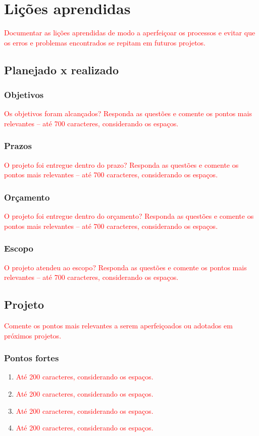 \chapter{Lições aprendidas}

\textcolor{red}{Documentar as lições aprendidas de modo a aperfeiçoar os processos e evitar que os erros e problemas encontrados se repitam em futuros projetos.}

\section{Planejado x realizado}
\subsection{Objetivos}
\textcolor{red}{Os objetivos foram alcançados? Responda as questões e comente os pontos mais relevantes – até 700 caracteres, considerando os espaços.}
\subsection{Prazos}
\textcolor{red}{O projeto foi entregue dentro do prazo? Responda as questões e comente os pontos mais relevantes – até 700 caracteres, considerando os espaços.}
\subsection{Orçamento}
\textcolor{red}{O projeto foi entregue dentro do orçamento? Responda as questões e comente os pontos mais relevantes – até 700 caracteres, considerando os espaços.}
\subsection{Escopo}
\textcolor{red}{O  projeto atendeu ao escopo? Responda as questões e comente os pontos mais relevantes – até 700 caracteres, considerando os espaços.}

\section{Projeto}
\textcolor{red}{Comente os pontos mais relevantes a serem aperfeiçoados ou adotados em próximos projetos.}
\subsection{Pontos fortes}
\begin{enumerate}
	\item \textcolor{red}{Até 200 caracteres, considerando os espaços.}
	\item \textcolor{red}{Até 200 caracteres, considerando os espaços.}
	\item \textcolor{red}{Até 200 caracteres, considerando os espaços.}
	\item \textcolor{red}{Até 200 caracteres, considerando os espaços.}
\end{enumerate}
